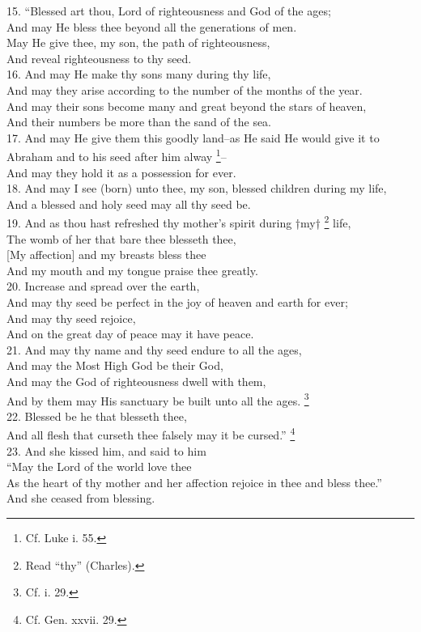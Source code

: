 15. ``Blessed art thou, Lord of righteousness and God of the ages;\\
And may He bless thee beyond all the generations of men.\\
May He give thee, my son, the path of righteousness,\\
And reveal righteousness to thy seed.\\
16. And may He make thy sons many during thy life,\\
And may they arise according to the number of the months of the year.\\
And may their sons become many and great beyond the stars of heaven,\\
And their numbers be more than the sand of the sea.\\
17. And may He give them this goodly land--as He said He would give it to Abraham and to his seed after him alway \footnote{Cf. Luke i. 55.}--\\
And may they hold it as a possession for ever.\\
18. And may I see (born) unto thee, my son, blessed children during my life,\\
And a blessed and holy seed may all thy seed be.\\
19. And as thou hast refreshed thy mother's spirit during †my† \footnote{Read ``thy'' (Charles).} life,\\
The womb of her that bare thee blesseth thee,\\
{}[My affection] and my breasts bless thee\\
And my mouth and my tongue praise thee greatly.\\
20. Increase and spread over the earth,\\
And may thy seed be perfect in the joy of heaven and earth for ever;\\
And may thy seed rejoice,\\
And on the great day of peace may it have peace.\\
21. And may thy name and thy seed endure to all the ages,\\
And may the Most High God be their God,\\
And may the God of righteousness dwell with them, \\
And by them may His sanctuary be built unto all the ages. \footnote{Cf. i. 29.}\\
22. Blessed be he that blesseth thee,\\
And all flesh that curseth thee falsely may it be cursed.'' \footnote{Cf. Gen. xxvii. 29.}\\
23. And she kissed him, and said to him\\
``May the Lord of the world love thee\\
As the heart of thy mother and her affection rejoice in thee and bless thee.''\\
And she ceased from blessing.

